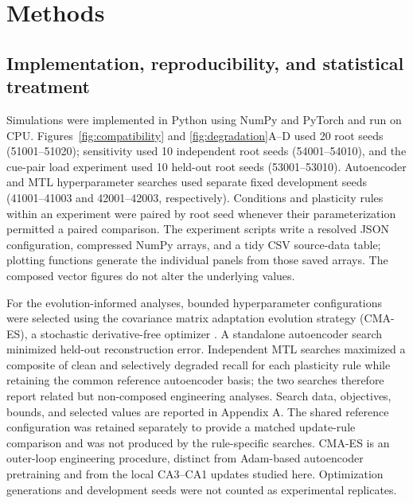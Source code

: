 \section{Methods}

\subsection{Implementation, reproducibility, and statistical treatment}

Simulations were implemented in Python using NumPy and PyTorch and run on CPU.
Figures~\ref{fig:compatibility} and \ref{fig:degradation}A--D used 20 root
seeds (51001--51020); sensitivity used 10 independent root seeds
(54001--54010), and the cue-pair load experiment used 10 held-out root seeds
(53001--53010). Autoencoder and MTL hyperparameter searches used separate fixed
development seeds (41001--41003 and 42001--42003, respectively). Conditions
and plasticity rules within an experiment were paired by root seed whenever
their parameterization permitted a paired comparison.
The experiment scripts write a resolved JSON configuration, compressed NumPy
arrays, and a tidy CSV source-data table; plotting functions generate the
individual panels from those saved arrays. The composed vector figures do not
alter the underlying values.

For the evolution-informed analyses, bounded hyperparameter configurations were
selected using the covariance matrix adaptation evolution strategy (CMA-ES), a
stochastic derivative-free optimizer \citep{hansen2016}. A standalone
autoencoder search minimized held-out reconstruction error. Independent MTL
searches maximized a composite of clean and selectively degraded recall for
each plasticity rule while retaining the common reference autoencoder basis;
the two searches therefore report related but non-composed engineering
analyses.
Search data, objectives, bounds, and selected values are reported in Appendix
A. The shared reference configuration was retained separately to provide a
matched update-rule comparison and was not produced by the rule-specific
searches. CMA-ES is an outer-loop engineering procedure, distinct from Adam-based
autoencoder pretraining and from the local CA3--CA1 updates studied here.
Optimization generations and development seeds were not counted as
experimental replicates.

